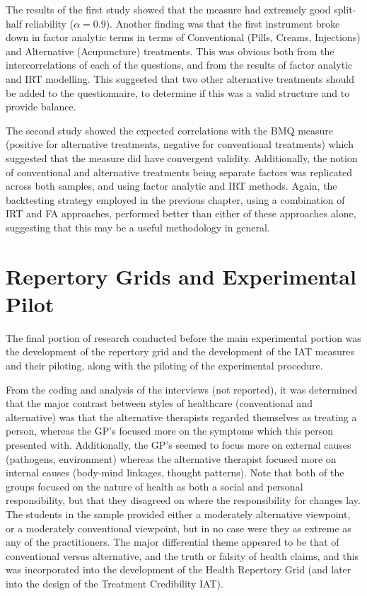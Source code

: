 The results of the first study showed that the measure had extremely
good split-half reliability ($ \alpha=0.9$). Another finding was that
the first instrument broke down in factor analytic terms in terms of
Conventional (Pills, Creams, Injections) and Alternative (Acupuncture)
treatments. This was obvious both from the intercorrelations of each
of the questions, and from the results of factor analytic and IRT
modelling. This suggested that two other alternative treatments should
be added to the questionnaire, to determine if this was a valid
structure and to provide balance.

The second study showed the expected correlations with the BMQ measure
(positive for alternative treatments, negative for conventional
treatments) which suggested that the measure did have convergent
validity. Additionally, the notion of conventional and alternative
treatments being separate factors was replicated across both samples,
and using factor analytic and IRT methods. Again, the backtesting
strategy employed in the previous chapter, using a combination of IRT
and FA approaches, performed better than either of these approaches
alone, suggesting that this may be a useful methodology in general.


\section{Repertory Grids and Experimental Pilot}
\label{sec:qual-rese-rep}

The final portion of research conducted before the main experimental
portion was the development of the repertory grid and the development
of the IAT measures and their piloting, along with the piloting of the
experimental procedure.

From the coding and analysis of the interviews (not reported), it was determined
that the major contrast between styles of healthcare (conventional and
alternative) was that the alternative therapists regarded themselves
as treating a person, whereas the GP's focused more on the symptoms
which this person presented with. Additionally, the GP's seemed to
focus more on external causes (pathogens, environment) whereas the
alternative therapist focused more on internal causes (body-mind
linkages, thought patterns). Note that both of the groups focused on
the nature of health as both a social and personal responsibility, but
that they disagreed on where the responsibility for changes lay. The
students in the sample provided either a moderately alternative
viewpoint, or a moderately conventional viewpoint, but in no case were
they as extreme as any of the practitioners. The major differential
theme appeared to be that of conventional versus alternative, and the
truth or falsity of health claims, and this was incorporated into the
development of the Health Repertory Grid (and later into the design of
the Treatment Credibility IAT).

